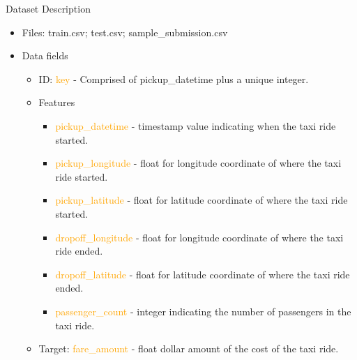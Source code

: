 \documentclass[
 size=14pt,
 paper=smartboard,  %
 mode=present, 		%
 display=slides, 	%
 style=tuliplab,  	%
 pauseslide,
 fleqn,leqno]{powerdot}
\begin{document}
\begin{slide}{Dataset Description}
  \begin{itemize}
  \item
  Files: train.csv; test.csv; sample_submission.csv
  \end{itemize}

  \begin{itemize}
  \item
  Data fields
    \begin{itemize}
    \item
    ID: \textcolor{orange}{key} - Comprised of pickup_datetime plus a unique integer.

    \item
    Features
      \begin{itemize}
      \item
      \textcolor{orange}{pickup_datetime} - timestamp value indicating when the taxi ride started.
      \item
      \textcolor{orange}{pickup_longitude}  - float for longitude coordinate of where the taxi ride started.
      \item
      \textcolor{orange}{pickup_latitude} - float for latitude coordinate of where the taxi ride started.
      \item
      \textcolor{orange}{dropoff_longitude} - float for longitude coordinate of where the taxi ride ended.
      \item
      \textcolor{orange}{dropoff_latitude} - float for latitude coordinate of where the taxi ride ended.
      \item
      \textcolor{orange}{passenger_count} - integer indicating the number of passengers in the taxi ride.
      \end{itemize}
    
    \item
    Target: \textcolor{orange}{fare_amount} - float dollar amount of the cost of the taxi ride. 
    \end{itemize}
  \end{itemize}
  
\end{slide}
\end{document}
